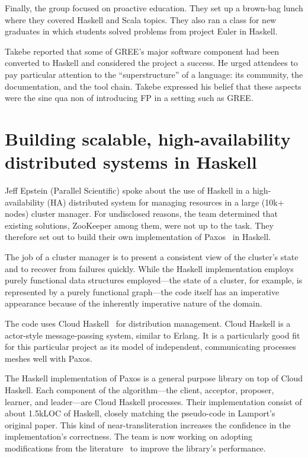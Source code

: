 \documentclass{jfp1}
\begin{document}
Finally, the group focused on proactive education. They set up a brown-bag
lunch where they covered Haskell and Scala topics. They also ran a class
for new graduates in which students solved problems from project Euler in
Haskell.

Takebe reported that some of GREE's major software component had been
converted to Haskell and considered the project a success. He urged
attendees to pay particular attention to the ``superstructure'' of a
language: its community, the documentation, and the tool chain. Takebe
expressed his belief that these aspects were the sine qua non of
introducing FP in a setting such as GREE.

\section{Building scalable, high-availability distributed systems in Haskell}


Jeff Epstein (Parallel Scientific) spoke about the use of Haskell in a
high-availability (HA) distributed system for managing resources in a large
(10k+ nodes) cluster manager.  For undisclosed reasons, the team determined
that existing solutions, ZooKeeper among them, were not up to the
task. They therefore set out to build their own implementation of
Paxos~\cite{Lamport:1998:Part} in Haskell.

The job of a cluster manager is to present a consistent view of the
cluster's state and to recover from failures quickly. While the Haskell
implementation employs purely functional data structures employed---the
state of a cluster, for example, is represented by a purely functional
graph---the code itself has an imperative appearance because of the
inherently imperative nature of the domain.

The code uses Cloud Haskell~\cite{Epstein:2011:Towards} for distribution
management. Cloud Haskell is a actor-style message-passing system, similar
to Erlang. It is a particularly good fit for this particular project as its
model of independent, communicating processes meshes well with Paxos.

The Haskell implementation of Paxos is a general purpose library on top of
Cloud Haskell. Each component of the algorithm---the client, acceptor,
proposer, learner, and leader---are Cloud Haskell processes.  Their
implementation consist of about 1.5kLOC of Haskell, closely matching the
pseudo-code in Lamport's original paper.  This kind of near-transliteration
increases the confidence in the implementation's correctness. The team is
now working on adopting modifications from the
literature~\cite{Chandra:2007:Paxos} to improve the library's performance.
\end{document}
